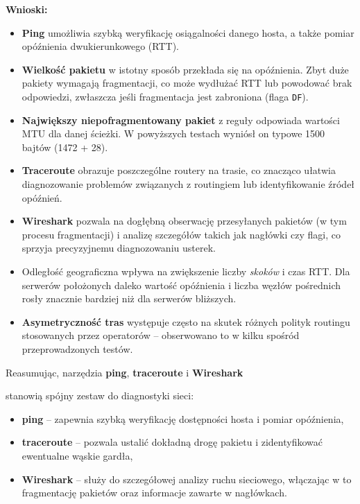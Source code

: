 \documentclass{article}
\begin{document}
\vspace{11\baselineskip}
\textbf{Wnioski: }
\begin{itemize}
  \item \textbf{Ping} umożliwia szybką weryfikację osiągalności danego hosta, a także pomiar opóźnienia dwukierunkowego (RTT).
  \item \textbf{Wielkość pakietu} w istotny sposób przekłada się na opóźnienia. Zbyt duże pakiety wymagają fragmentacji, co może wydłużać RTT lub powodować brak odpowiedzi, zwłaszcza jeśli fragmentacja jest zabroniona (flaga \texttt{DF}).
  \item \textbf{Największy niepofragmentowany pakiet} z reguły odpowiada wartości MTU dla danej ścieżki. W powyższych testach wyniósł on typowe 1500 bajtów (1472 + 28).
  \item \textbf{Traceroute} obrazuje poszczególne routery na trasie, co znacząco ułatwia diagnozowanie problemów związanych z routingiem lub identyfikowanie źródeł opóźnień.
  \item \textbf{Wireshark} pozwala na dogłębną obserwację przesyłanych pakietów (w tym procesu fragmentacji) i analizę szczegółów takich jak nagłówki czy flagi, co sprzyja precyzyjnemu diagnozowaniu usterek.
  \item Odległość geograficzna wpływa na zwiększenie liczby \textit{skoków} i czas RTT. Dla serwerów położonych daleko wartość opóźnienia i liczba węzłów pośrednich rosły znacznie bardziej niż dla serwerów bliższych.
  \item \textbf{Asymetryczność tras} występuje często na skutek różnych polityk routingu stosowanych przez operatorów – obserwowano to w kilku spośród przeprowadzonych testów.
\end{itemize}

Reasumując, narzędzia \textbf{ping}, \textbf{traceroute} i \textbf{Wireshark} \par stanowią spójny zestaw do diagnostyki sieci:
\begin{itemize}
  \item \textbf{ping} – zapewnia szybką weryfikację dostępności hosta i pomiar opóźnienia,
  \item \textbf{traceroute} – pozwala ustalić dokładną drogę pakietu i zidentyfikować ewentualne wąskie gardła,
  \item \textbf{Wireshark} – służy do szczegółowej analizy ruchu sieciowego, włączając w to fragmentację pakietów oraz informacje zawarte w nagłówkach.
\end{itemize}
\end{document}
